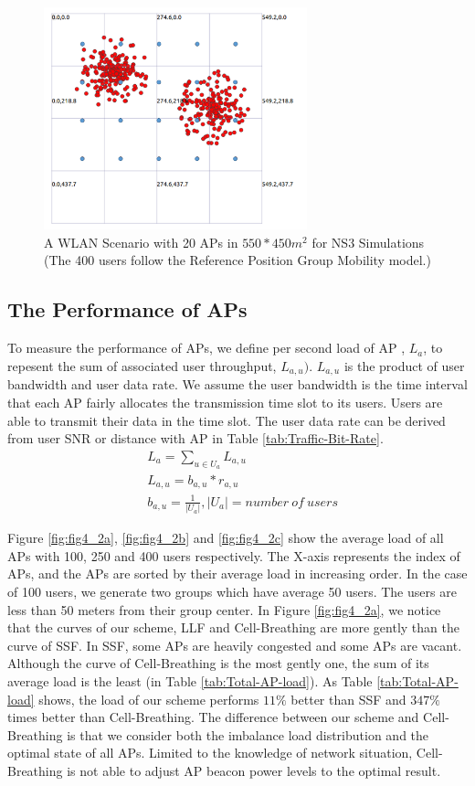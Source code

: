\begin{figure}[tbp]
\begin{center}
\includegraphics[width=3in]{images/400n.png}
\end{center}
\caption{A WLAN Scenario with 20 APs in $550*450m^2$ for NS3 Simulations (The 400 users follow the Reference Position Group Mobility model.)}
\label{fig:scenario-400n}
\end{figure}

\subsection{The Performance of APs}
To measure the performance of APs, we define per second load of AP , $L_a$, to repesent the sum of associated user throughput, $L_{a,u})$. $L_{a,u}$ is the product of user bandwidth and user data rate. We assume the user bandwidth is the time interval that each AP fairly allocates the transmission time slot to its users. Users are able to transmit their data in the time slot. The user data rate can be derived from user SNR or distance with AP in Table \ref{tab:Traffic-Bit-Rate}.
\begin{align}
&L_a=\sum_{u\in{U_a}}L_{a,u}\\
&L_{a,u}=b_{a,u}*r_{a,u}\\
&b_{a,u}=\frac{1}{|U_a|}   ,|U_a|={number\ of\ users}
\end{align}

Figure \ref{fig:fig4_2a}, \ref{fig:fig4_2b} and \ref{fig:fig4_2c} show the average load of all APs with 100, 250 and 400 users respectively. The X-axis represents the index of APs, and the APs are sorted by their average load in increasing order. In the case of 100 users, we generate two groups which have average 50 users. The users are less than 50 meters from their group center. In Figure \ref{fig:fig4_2a}, we notice that the curves of our scheme, LLF and Cell-Breathing are more gently than the curve of SSF. In SSF, some APs are heavily congested and some APs are vacant.  Although the curve of Cell-Breathing is the most gently one, the sum of its average load is the least (in Table \ref{tab:Total-AP-load}). As Table \ref{tab:Total-AP-load} shows, the load of our scheme performs $11\%$ better than SSF and $347\%$ times better than Cell-Breathing. The difference between our scheme and Cell-Breathing is that we consider both the imbalance load distribution and the optimal state of all APs. Limited to the knowledge of network situation, Cell-Breathing is not able to adjust AP beacon power levels to the optimal result.


